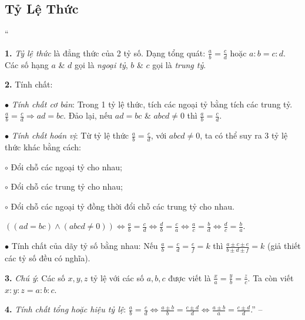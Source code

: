 \documentclass{article}
\numberwithin{equation}{section}
\begin{document}

\subsection{Tỷ Lệ Thức}
``\begin{enumerate*}
	\item[\textbf{1.}] \textit{Tỷ lệ thức} là đẳng thức của 2 tỷ số. Dạng tổng quát: $\frac{a}{b} = \frac{c}{d}$ hoặc $a:b = c:d$. Các số hạng $a$ \& $d$ gọi là \textit{ngoại tỷ}, $b$ \& $c$ gọi là \textit{trung tỷ}.
	\item[\textbf{2.}] Tính chất:
	\begin{enumerate*}
		\item[$\bullet$] \textit{Tính chất cơ bản}: Trong 1 tỷ lệ thức, tích các ngoại tỷ bằng tích các trung tỷ. $\frac{a}{b} = \frac{c}{d}\Rightarrow ad = bc$. Đảo lại, nếu $ad = bc$ \& $abcd\ne 0$ thì $\frac{a}{b} = \frac{c}{d}$.
		\item[$\bullet$] \textit{Tính chất hoán vị}: Từ tỷ lệ thức $\frac{a}{b} = \frac{c}{d}$, với $abcd\ne 0$, ta có thể suy ra 3 tỷ lệ thức khác bằng cách:
		\begin{enumerate*}
			\item[$\circ$] Đổi chỗ các ngoại tỷ cho nhau;
			\item[$\circ$] Đổi chỗ các trung tỷ cho nhau;
			\item[$\circ$] Đổi chỗ các ngoại tỷ đồng thời đổi chỗ các trung tỷ cho nhau.
		\end{enumerate*}
		$((ad = bc)\land(abcd\ne 0))\Leftrightarrow\frac{a}{b} = \frac{c}{d}\Leftrightarrow\frac{d}{b} = \frac{c}{a}\Leftrightarrow\frac{a}{c} = \frac{b}{d}\Leftrightarrow\frac{d}{c} = \frac{b}{a}$.
		\item[$\bullet$] Tính chất của dãy tỷ số bằng nhau: Nếu $\frac{a}{b} = \frac{c}{d} = \frac{e}{f} = k$ thì $\frac{a\pm c\pm e}{b\pm d\pm f} = k$ (giả thiết các tỷ số đều có nghĩa).
	\end{enumerate*}
	\item[\textbf{3.}] \textit{Chú ý}: Các số $x,y,z$ tỷ lệ với các số $a,b,c$ được viết là $\frac{x}{a} = \frac{y}{b} = \frac{z}{c}$. Ta còn viết $x:y:z = a:b:c$.
	\item[\textbf{4.}] \textit{Tính chất tổng hoặc hiệu tỷ lệ}: $\frac{a}{b} = \frac{c}{d}\Leftrightarrow\frac{a\pm b}{b} = \frac{c\pm d}{d}\Leftrightarrow\frac{a\pm b}{a} = \frac{c\pm d}{d}$.'' -- \cite[Chap. 2, \S5, pp. 25--26]{Tuyen_Toan_7}
\end{enumerate*}
\end{document}
